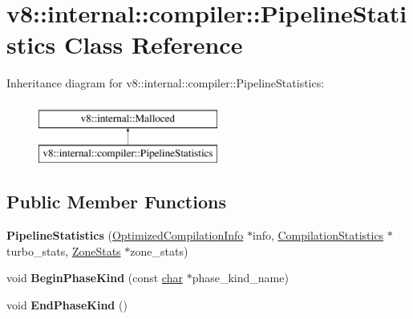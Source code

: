 \hypertarget{classv8_1_1internal_1_1compiler_1_1PipelineStatistics}{}\section{v8\+:\+:internal\+:\+:compiler\+:\+:Pipeline\+Statistics Class Reference}
\label{classv8_1_1internal_1_1compiler_1_1PipelineStatistics}
Inheritance diagram for v8\+:\+:internal\+:\+:compiler\+:\+:Pipeline\+Statistics\+:\begin{figure}[H]
\begin{center}
\leavevmode
\includegraphics[height=2.000000cm]{classv8_1_1internal_1_1compiler_1_1PipelineStatistics}
\end{center}
\end{figure}
\subsection*{Public Member Functions}
\begin{DoxyCompactItemize}
\item 
\mbox{\label{classv8_1_1internal_1_1compiler_1_1PipelineStatistics_abbe7fb5303d17166d0a6f7940714abc2}} 
{\bfseries Pipeline\+Statistics} (\mbox{\hyperlink{classv8_1_1internal_1_1OptimizedCompilationInfo}{Optimized\+Compilation\+Info}} $\ast$info, \mbox{\hyperlink{classv8_1_1internal_1_1CompilationStatistics}{Compilation\+Statistics}} $\ast$turbo\+\_\+stats, \mbox{\hyperlink{classv8_1_1internal_1_1compiler_1_1ZoneStats}{Zone\+Stats}} $\ast$zone\+\_\+stats)
\item 
\mbox{\label{classv8_1_1internal_1_1compiler_1_1PipelineStatistics_acd50ae95f638dfa5ea62dbea5e79eac0}} 
void {\bfseries Begin\+Phase\+Kind} (const \mbox{\hyperlink{classchar}{char}} $\ast$phase\+\_\+kind\+\_\+name)
\item 
\mbox{\label{classv8_1_1internal_1_1compiler_1_1PipelineStatistics_aa24205eb02f285ace465a6fbb0592b9d}} 
void {\bfseries End\+Phase\+Kind} ()
\end{DoxyCompactItemize}
